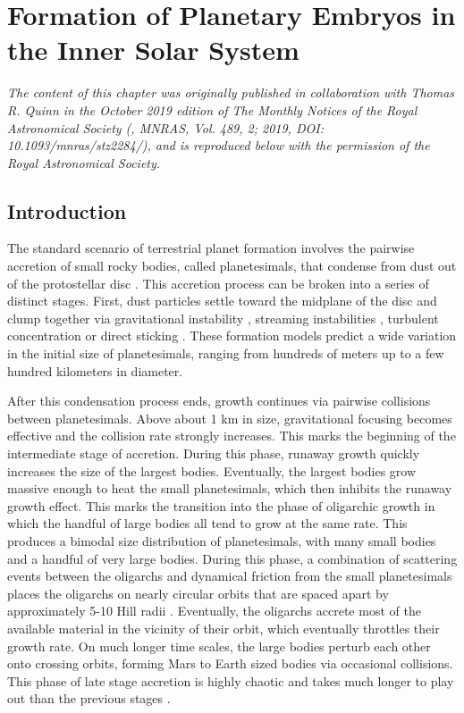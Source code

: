 \chapter {Formation of Planetary Embryos in the Inner Solar System}\label{ch:plSS}

\noindent \textit{The content of this chapter was originally published in collaboration with Thomas R. Quinn in the October 2019 edition of The Monthly Notices of the Royal Astronomical Society (\cite{wallace19}, MNRAS, Vol. 489, 2; 2019, DOI: 10.1093/mnras/stz2284/), and is reproduced below with the permission of the Royal Astronomical Society.}

\section{Introduction} \label{sec:intro}

The standard scenario of terrestrial planet formation involves the pairwise accretion of small rocky bodies, called planetesimals, 
that condense from dust out of the protostellar disc \cite{safronov69}. This accretion process can be broken into a series of 
distinct stages. First, dust particles settle toward the midplane of the disc and clump together via gravitational instability 
\cite{goldreich73, youdin02}, streaming instabilities \cite{johansen07, johansen15}, turbulent concentration 
\cite{chambers10, cuzzi08, cuzzi10, hopkins16} or direct sticking \cite{okuzumi12, windmark12, garaud13, katoka13}. These 
formation models predict a wide variation in the initial size of planetesimals, ranging from hundreds of meters up to a few 
hundred kilometers in diameter.

After this condensation process ends, growth continues via pairwise collisions between planetesimals. Above about 1 km in size, 
gravitational focusing becomes effective and the collision rate strongly increases. This marks the beginning of the intermediate 
stage of accretion. During this phase, runaway growth \cite{duncan89, kokubo96, barnes09} quickly increases the size of the 
largest bodies. Eventually, the largest bodies grow massive enough to heat the small planetesimals, which then inhibits the 
runaway growth effect. This marks the transition into the phase of oligarchic growth in which the handful of large bodies all tend 
to grow at the same rate. This produces a bimodal size distribution of planetesimals, with many small bodies and a handful of 
very large bodies. During this phase, a combination of scattering events between the oligarchs and dynamical friction from the 
small planetesimals places the oligarchs on nearly circular orbits that are spaced apart by approximately 5-10 Hill radii 
\cite{kokubo98}. Eventually, the oligarchs accrete most of the available material in the vicinity of their orbit, which eventually 
throttles their growth rate. On much longer time scales, the large bodies perturb each other onto crossing orbits, forming Mars to 
Earth sized bodies via occasional collisions. This phase of late stage accretion is highly chaotic and takes much longer to play 
out than the previous stages \cite{chambers98, raymond06}.

